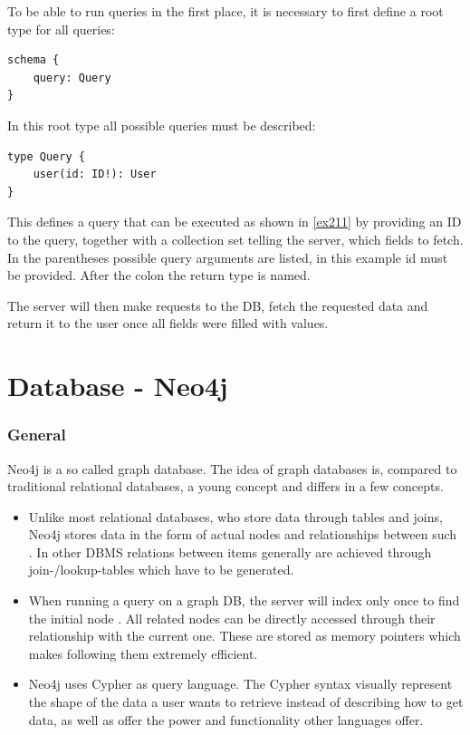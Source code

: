 To be able to run queries in the first place, it is necessary to first define a root type for all queries:

\begin{lstlisting}[caption={Root Type Definition}]
schema {
	query: Query
}
\end{lstlisting}

In this root type all possible queries must be described:

\begin{lstlisting}[caption={Defining Queries}]
type Query { 
	user(id: ID!): User 
}
\end{lstlisting}

This defines a query that can be executed as shown in \autoref{ex211} by providing an ID to the query, together with a collection set telling the server, which fields to fetch. In the parentheses possible query arguments are listed, in this example id must be provided. After the colon the return type is named. 

The server will then make requests to the DB, fetch the requested data and return it to the user once all fields were filled with values.


\section{Database - Neo4j}
\subsubsection{General}
Neo4j is a so called graph database. The idea of graph databases is, compared to traditional relational databases, a young concept and differs in a few concepts.

\begin{itemize}
\item Unlike most relational databases, who store data through tables and joins, Neo4j stores data in the form of actual nodes and relationships between such \cite{Neo4jDevGuides}. In other DBMS relations between items generally are achieved through join-/lookup-tables which have to be generated. \cite{RelVsGraph}

\item When running a query on a graph DB, the server will index only once to find the initial node \citep[minute 32]{NeoInternals}. All related nodes can be directly accessed through their relationship with the current one. \cite{WhatGraphDB} These are stored as memory pointers which makes following them extremely efficient.

\item Neo4j uses Cypher as query language. The Cypher syntax visually represent the shape of the data a user wants to retrieve instead of describing how to get data, as well as offer the power and functionality other languages offer. \cite{Neo4jCypher} 
\end{itemize}

